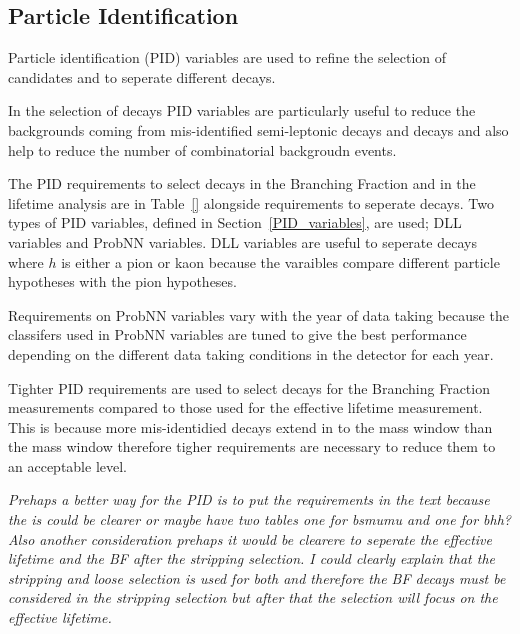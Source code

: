 \subsection{Particle Identification}
\label{sec:PID}
Particle identification (PID) variables are used to refine the selection of \bmumu candidates and to seperate different \bhh decays. 

In the selection of \bmumu decays PID variables are particularly useful to reduce the backgrounds coming from mis-identified semi-leptonic decays and \bhh decays and also help to reduce the number of combinatorial backgroudn events. 

The PID requirements to select \bmumu decays in the Branching Fraction and \bsmumu in the lifetime analysis are in Table~\ref{} alongside requirements to seperate \bhh decays. Two types of PID variables, defined in Section~\ref{PID_variables}, are used; DLL variables and ProbNN variables. DLL variables are useful to seperate \bhh decays where $h$ is either a pion or kaon because the varaibles compare different particle hypotheses with the pion hypotheses.

Requirements on ProbNN variables vary with the year of data taking because the classifers used in ProbNN variables are tuned to give the best performance depending on the different data taking conditions in the detector for each year. %

Tighter PID requirements are used to select \bmumu decays for the Branching Fraction measurements compared to those used for the effective lifetime measurement. This is because more mis-identidied decays extend in to the \bd mass window than the \bs mass window therefore tigher requirements are necessary to reduce them to an acceptable level. %

{\it Prehaps a better way for the PID is to put the requirements in the text because the is could be clearer or maybe have two tables one for bsmumu and one for bhh? Also another consideration prehaps it would be clearere to seperate the effective lifetime and the BF after the stripping selection. I could clearly explain that the stripping and loose selection is used for both and therefore the BF decays must be considered in the stripping selection but after that the selection will focus on the effective lifetime. }


